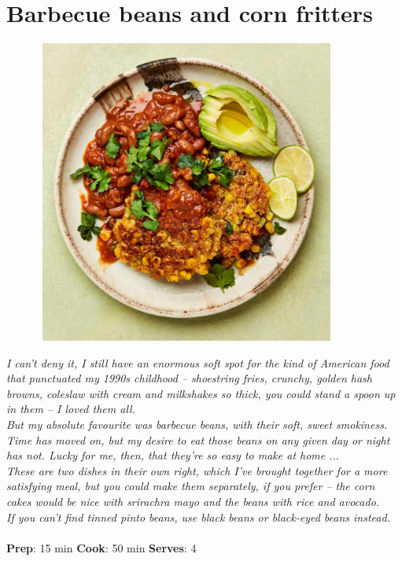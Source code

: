 \documentclass{book}
\begin{document}
\section{Barbecue beans and corn fritters}
\begin{figure}
\centering\includegraphics[width=10cm,height=10cm,keepaspectratio]{Recipe_Pictures/Barbecue_beans_and_corn_fritters.png}
\end{figure}
\emph{I can’t deny it, I still have an enormous soft spot for the kind of American food that punctuated my 1990s childhood – shoestring fries, crunchy, golden hash browns, coleslaw with cream and milkshakes so thick, you could stand a spoon up in them – I loved them all. \\ 
But my absolute favourite was barbecue beans, with their soft, sweet smokiness. Time has moved on, but my desire to eat those beans on any given day or night has not. Lucky for me, then, that they’re so easy to make at home ...\\ 
These are two dishes in their own right, which I’ve brought together for a more satisfying meal, but you could make them separately, if you prefer – the corn cakes would be nice with srirachra mayo and the beans with rice and avocado.\\ 
If you can’t find tinned pinto beans, use black beans or black-eyed beans instead.}\\\\ 
\textbf{Prep}: 15 min
\textbf{Cook}: 50 min
\textbf{Serves}: 4
\end{document}

